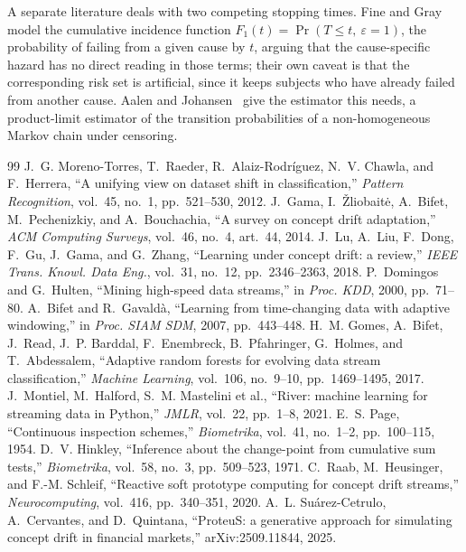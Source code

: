 \documentclass[10pt,a4paper]{article}
\begin{document}
A separate literature deals with two competing stopping times. Fine and Gray~\cite{fine1999}
model the cumulative incidence function $F_1(t)=\Pr(T\le t,\ \varepsilon=1)$, the probability
of failing from a given cause by $t$, arguing that the cause-specific hazard has no direct
reading in those terms; their own caveat is that the corresponding risk set is artificial,
since it keeps subjects who have already failed from another cause. Aalen and
Johansen~\cite{aalen1978} give the estimator this needs, a product-limit estimator of the
transition probabilities of a non-homogeneous Markov chain under censoring.

\vspace{-0.2em}
{\footnotesize
\begin{thebibliography}{99}\setlength{\itemsep}{0pt}
 J.~G. Moreno-Torres, T.~Raeder, R.~Alaiz-Rodríguez, N.~V. Chawla, and F.~Herrera, ``A unifying view on dataset shift in classification,'' \emph{Pattern Recognition}, vol.~45, no.~1, pp.~521--530, 2012.
 J.~Gama, I.~Žliobaitė, A.~Bifet, M.~Pechenizkiy, and A.~Bouchachia, ``A survey on concept drift adaptation,'' \emph{ACM Computing Surveys}, vol.~46, no.~4, art.~44, 2014.
 J.~Lu, A.~Liu, F.~Dong, F.~Gu, J.~Gama, and G.~Zhang, ``Learning under concept drift: a review,'' \emph{IEEE Trans. Knowl. Data Eng.}, vol.~31, no.~12, pp.~2346--2363, 2018.
 P.~Domingos and G.~Hulten, ``Mining high-speed data streams,'' in \emph{Proc. KDD}, 2000, pp.~71--80.
 A.~Bifet and R.~Gavaldà, ``Learning from time-changing data with adaptive windowing,'' in \emph{Proc. SIAM SDM}, 2007, pp.~443--448.
 H.~M. Gomes, A.~Bifet, J.~Read, J.~P. Barddal, F.~Enembreck, B.~Pfahringer, G.~Holmes, and T.~Abdessalem, ``Adaptive random forests for evolving data stream classification,'' \emph{Machine Learning}, vol.~106, no.~9--10, pp.~1469--1495, 2017.
 J.~Montiel, M.~Halford, S.~M. Mastelini et al., ``River: machine learning for streaming data in Python,'' \emph{JMLR}, vol.~22, pp.~1--8, 2021.
 E.~S. Page, ``Continuous inspection schemes,'' \emph{Biometrika}, vol.~41, no.~1--2, pp.~100--115, 1954.
 D.~V. Hinkley, ``Inference about the change-point from cumulative sum tests,'' \emph{Biometrika}, vol.~58, no.~3, pp.~509--523, 1971.
 C.~Raab, M.~Heusinger, and F.-M. Schleif, ``Reactive soft prototype computing for concept drift streams,'' \emph{Neurocomputing}, vol.~416, pp.~340--351, 2020.
 A.~L. Suárez-Cetrulo, A.~Cervantes, and D.~Quintana, ``ProteuS: a generative approach for simulating concept drift in financial markets,'' arXiv:2509.11844, 2025.

\end{thebibliography}}
\end{document}
